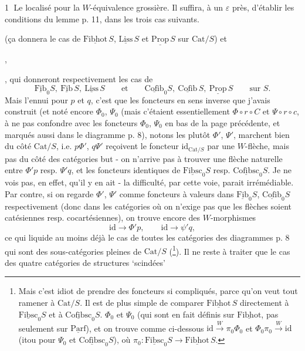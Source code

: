 \documentclass[11pt]{article}
\newcommand{\printedpage}[1]{\marginpar{\footnotesize p.~#1}}
\newcommand{\msp}[1]{\marginpar{\footnotesize [#1]}}
\newcommand{\uc}[1]{\underline{\mathrm{#1}}}
\newcommand{\Cat}{\mathrm{Cat}}
\begin{document}
\textcircled{1} Le localisé pour la $W$-équivalence grossière. Il suffira, à un $\varepsilon$ près, d'établir les conditions du lemme p. 11, dans les trois cas suivants.
(ça donnera le cas de $\uc{Fibhot}\,S$, $\uc{Liss}\,S$ et $\uc{Prop}\,S$ sur $\Cat/S$) et
,
,
qui donneront respectivement les cas de
\[
\uc{Fib}_0S,\ \uc{Fib}\,S,\ \uc{Liss}\,S \qquad \text{et} \qquad \uc{Cofib}_0S,\ \uc{Cofib}\,S,\ \uc{Prop}\,S \qquad \text{sur } S.
\]
Mais l'ennui pour $p$ et $q$, c'est que les foncteurs en sens inverse que j'avais construit (et noté encore $\Phi_0$, $\Psi_0$ (mais c'étaient essentiellement $\Phi\circ r\circ C$ et $\Psi\circ r\circ c$, à ne pas confondre avec les foncteurs $\Phi_0$, $\Psi_0$ en bas de la page précédente, et marqués aussi dans le diagramme p. 8), notons les plutôt $\Phi'$, $\Psi'$, marchent bien du côté $\Cat/S$, i.e. $p\Phi'$, $q\Psi'$ reçoivent le foncteur $\mathrm{id}_{\Cat/S}$ par une $W$-flèche, mais pas du côté des catégories but - on n'arrive pas à trouver une flèche naturelle entre $\Phi'p$ resp. $\Psi'q$, et les foncteurs identiques de $\uc{Fibsc}_0S$ resp. $\uc{Cofibsc}_0S$. Je ne vois
\msp{page 53}
pas, en effet, qu'il y en ait - la difficulté, par cette voie, parait irrémédiable. Par contre, si on regarde $\Phi'$, $\Psi'$ comme foncteurs à valeurs dans $\uc{Fib}_0S$, $\uc{Cofib}_0S$ respectivement (donc dans les catégories où on n'exige pas que les flèches soient catésiennes resp. cocartésiennes), on trouve encore des $W$-morphismes %
\[
\mathrm{id} \longrightarrow \Phi'p, \qquad \mathrm{id} \longrightarrow \psi'q, %
\]
ce qui liquide au moins déjà le cas de toutes les catégories des diagrammes p. 8 qui sont des
\printedpage{33}
sous-catégories pleines de $\Cat/S$ (\footnote[36]{Mais c'est idiot de prendre des foncteurs si compliqués, parce qu'on veut tout ramener à $\Cat/S$. Il est de plus simple de comparer $\uc{Fibhot}\,S$ directement à $\uc{Fibsc}_0S$ et à $\uc{Cofibsc}_0S$. $\Phi_0$ et $\Psi_0$ (qui sont en fait définis sur $\uc{Fibhot}$, pas seulement sur $\uc{Parf}$), et on trouve comme ci-dessous $\mathrm{id} \xrightarrow{W} \pi_0\Phi_0$ et $\Phi_0\pi_0 \xrightarrow{W} \mathrm{id}$ (itou pour $\Psi_0$ et $\uc{Cofibsc}_0S$), où $\pi_0 : \uc{Fibsc}_0S \longrightarrow \uc{Fibhot}\,S$.}). Il ne reste à traiter que le cas des quatre catégories de structures `scindées'
\end{document}
